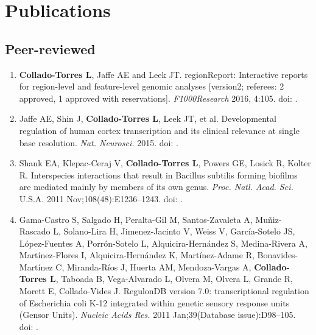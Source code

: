 \section{Publications}
\subsection{Peer-reviewed}
    \begin{enumerate}
        \item \textbf{Collado-Torres L}, Jaffe AE and Leek JT. regionReport: Interactive reports for region-level and feature-level genomic analyses [version2; referees: 2 approved, 1 approved with reservations]. \emph{F1000Research} 2016, 4:105. doi: .
        \item Jaffe AE, Shin J, \textbf{Collado-Torres L}, Leek JT, et al. Developmental regulation of human cortex transcription and its clinical relevance at single base resolution. \emph{Nat. Neurosci.} 2015. doi: .
        \item Shank EA, Klepac-Ceraj V, \textbf{Collado-Torres L}, Powers GE, Losick R, Kolter R. Interspecies interactions that result in Bacillus subtilis forming biofilms are mediated mainly by members of its own genus. \emph{Proc. Natl. Acad. Sci.} U.S.A. 2011 Nov;108(48):E1236–1243. doi: .
        \item Gama-Castro S, Salgado H, Peralta-Gil M, Santos-Zavaleta A, Muñiz-Rascado L, Solano-Lira H, Jimenez-Jacinto V, Weiss V, Garc\'ia-Sotelo JS, L\'opez-Fuentes A, Porr\'on-Sotelo L, Alquicira-Hern\'andez S, Medina-Rivera A, Mart\'inez-Flores I, Alquicira-Hern\'andez K, Mart\'inez-Adame R, Bonavides-Mart\'inez C, Miranda-R\'ios J, Huerta AM, Mendoza-Vargas A, \textbf{Collado-Torres L}, Taboada B, Vega-Alvarado L, Olvera M, Olvera L, Grande R, Morett E, Collado-Vides J. RegulonDB version 7.0: transcriptional regulation of Escherichia coli K-12 integrated within genetic sensory response units (Gensor Units). \emph{Nucleic Acids Res.} 2011 Jan;39(Database issue):D98–105. doi: .
    \end{enumerate}
